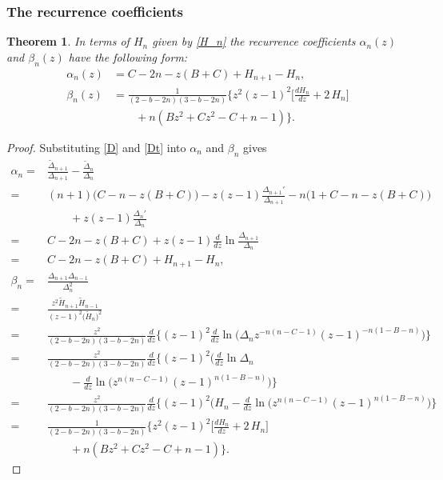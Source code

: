 \documentclass[12pt]{article}
\newtheorem{mydef}{Theorem}[section]
\numberwithin{figure}{section}
\numberwithin{equation}{section}
\numberwithin{table}{section}
\begin{document}
\subsubsection{The recurrence coefficients}
\begin{mydef}
In terms of $H_n$ given by \eqref{H_n} the recurrence coefficients $\alpha_n(z)$ and $\beta_n(z)$ have the following form:
\begin{align*}
\alpha_n(z)&=C-2n-z(B+C)+H_{n+1}-H_{n},\\
\beta_n(z)&=\frac{1}{(2-b-2n)(3-b-2n)}\bigg\{{z^2( z-1)^2\bigg[\frac {dH_n}{dz}} +2\,H_n\bigg]\\
&\qquad+n ( B{z}^{2}+C{z}^{2}-C+n-1 )\bigg\}.
\end{align*}
\end{mydef}
\begin{proof}
Substituting \eqref{D} and \eqref{Dt} into $\alpha_n$ and $\beta_n$ gives
\begin{align*}
\alpha_n=&\frac{\widetilde\Delta_{n+1}}{\Delta_{n+1}}-\frac{\widetilde\Delta_{n}}{\Delta_{n}}\\
=&(n+1)\big(C-n-z(B+C)\big)-z(z-1)\frac{\Delta_{n+1}'}{\Delta_{n+1}}-n\big(1+C-n-z(B+C)\big)\\
&\qquad+z(z-1)\frac{\Delta_n'}{\Delta_{n}}\\
=&C-2n-z(B+C)+z(z-1)\frac{d}{dz}\ln \frac{\Delta_{n+1}}{\Delta_{n}}\\
=&C-2n-z(B+C)+H_{n+1}-H_{n},\\
\beta_n=&\frac{\Delta_{n+1}\Delta_{n-1}}{\Delta_{n}^2}\\
=&\frac{z^2\widetilde{H}_{n+1}\widetilde{H}_{n-1}}{(z\!-\!1)^2\big(\widetilde{H}_n\big)^2}\\
=&\frac{z^2}{(2-b-2n)(3-b-2n)}\frac{d}{dz}\bigg\{(z\!-\!1)^2\frac{d}{dz}\ln\big(\Delta_nz^{-n(n-C-1)}(z-1)^{-n(1-B-n)}\big)\bigg\}\\
=&\frac{z^2}{(2-b-2n)(3-b-2n)}\frac{d}{dz}\bigg\{(z\!-\!1)^2\big(\frac{d}{dz}\ln\Delta_n\\
&\qquad-\frac{d}{dz}\ln(z^{n(n-C-1)}(z\!-\!1)^{n(1-B-n)}\big)\bigg\}\\
=&\frac{z^2}{(2-b-2n)(3-b-2n)}\frac{d}{dz}\bigg\{(z\!-\!1)^2\big(H_n-\frac{d}{dz}\ln(z^{n(n-C-1)}(z-1)^{n(1-B-n)}\big)\bigg\}\\
=&\frac{1}{(2-b-2n)(3-b-2n)}\bigg\{{z^2(z\!-\!1)^2\bigg[\frac {dH_n}{dz}} +2\,H_n\bigg]\\
&\qquad+n ( B{z}^{2}+C{z}^{2}-C+n-1 )\bigg\}.
\end{align*}
\end{proof}
\newpage
\end{document}
